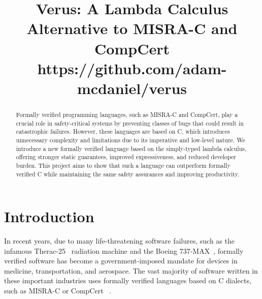 \documentclass[conference]{IEEEtran}
\begin{document}
\title{Verus: A Lambda Calculus Alternative to MISRA-C and CompCert\\
{\footnotesize https://github.com/adam-mcdaniel/verus}}

\author{
\and
{}
\and
{}
\and
{}
}

\maketitle

\begin{abstract}
Formally verified programming languages, such as MISRA-C and CompCert, play a crucial role in safety-critical systems by preventing classes of bugs that could result in catastrophic failures. However, these languages are based on C, which introduces unnecessary complexity and limitations due to its imperative and low-level nature. We introduce a new formally verified language based on the simply-typed lambda calculus, offering stronger static guarantees, improved expressiveness, and reduced developer burden. This project aims to show that such a language can outperform formally verified C while maintaining the same safety assurances and improving productivity.
\end{abstract}

\section{Introduction}
In recent years, due to many life-threatening software failures, such as the infamous Therac-25~\cite{therac25} radiation machine and the Boeing 737-MAX~\cite{boeing737max}, formally verified software has become a government-imposed mandate for devices in medicine, transportation, and aerospace. The vast majority of software written in these important industries uses formally verified languages based on C dialects, such as MISRA-C or CompCert ~\cite{boutekkouk2024}.
\end{document}
